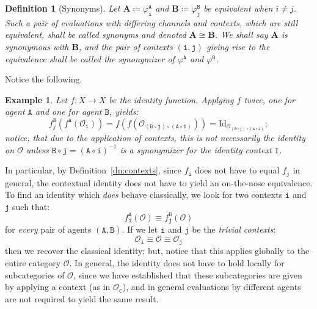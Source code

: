 \documentclass{article}
\newtheorem{dn}{Definition}
\newtheorem{eg}{Example}
\numberwithin{tm}{section}
\numberwithin{dn}{section}
\numberwithin{as}{section}
\numberwithin{rk}{section}
\numberwithin{lem}{section}
\numberwithin{ax}{section}
\numberwithin{pp}{section}
\numberwithin{eg}{section}
\numberwithin{war}{section}
\numberwithin{equation}{section}
\numberwithin{prop}{section}
\numberwithin{nt}{section}
\numberwithin{rc}{section}
\def\code#1{\texttt{#1}}
\begin{document}
\begin{dn} [Synonyms] \label{Synonyms}
	Let $\mathbf{A} \coloneq \varphi_{\code{i}}^\code{A}$ and $\mathbf{B} \coloneq \varphi_{\code{j}}^\code{B}$ be equivalent when $i \neq j$. Such a pair of evaluations with differing channels and contexts, which are still equivalent, shall be called \emph{synonyms} and denoted $\mathbf{A} \cong \mathbf{B}$. We shall say $\mathbf{A}$ is \emph{synonymous with} $\mathbf{B}$, and the pair of contexts $(\code{i}, \code{j})$ giving rise to the equivalence shall be called the \emph{synonymizer} of $\varphi^\code{A}$ and $\varphi^\code{B}$.
\end{dn}

Notice the following.
\begin{eg}
	Let $f: X \to X$ be the identity function. Applying $f$ twice, one for agent $\code{A}$ and one for agent $\code{B}$, yields:
	\begin{equation}
		f_j^\code{B}(f^\code{A}(\mathcal{O}_\code{i})) = f(f(\mathcal{O}_{(\code{B} \circ \code{j}) \circ (\code{A} \circ \code{i})})) = \mathrm{Id}_{\mathcal{O}_{(\code{B} \circ \code{j}) \circ (\code{A} \circ \code{i})}} ;
	\end{equation}
	notice, that due to the application of contexts, this is not necessarily the identity on $\mathcal{O}$ unless $\code{B} \circ \code{j} = (\code{A} \circ \code{i})^{-1}$ is a synonymizer for the identity context $\code{I}$.
\end{eg}
In particular, by Definition~\ref{dn:contexts}, since $f_\code{i}$ does not have to equal $f_\code{j}$ in general, the contextual identity does not have to yield an on-the-nose equivalence. To find an identity which \emph{does} behave classically, we look for two contexts $\code{i}$ and $\code{j}$ such that:
\begin{equation}
	f_\code{i}^\code{A}(\mathcal{O}) \equiv f_\code{j}^\code{B}(\mathcal{O})
\end{equation}
for \emph{every} pair of agents $(\code{A}, \code{B})$. If we let $\code{i}$ and $\code{j}$ be the \emph{trivial contexts}:
$$\mathcal{O}_\code{i} \equiv \mathcal{O} \equiv \mathcal{O}_\code{j}$$
then we recover the classical identity; but, notice that this applies globally to the entire category $\mathcal{O}$. In general, the identity does not have to hold locally for subcategories of $\mathcal{O}$, since we have established that these subcategories are given by applying a context (as in $\mathcal{O}_\code{c}$), and in general evaluations by different agents are not required to yield the same result.
\end{document}
